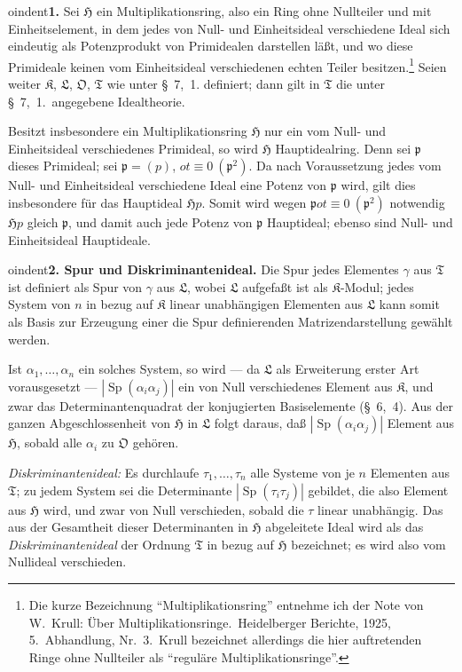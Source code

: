 \documentclass[12pt,a4paper]{article}
\newcommand{\idealp}{\mathfrak{p}}
\newcommand{\HH}{\mathfrak{H}}          %
\DeclareMathOperator{\Sp}{Sp}           %
\newcommand{\TT}{\mathfrak{T}}          %
\theoremstyle{definition}
\begin{document}
\medskip



oindent\textbf{1.} Sei $\HH$ ein Multiplikationsring, also ein Ring ohne
Nullteiler und mit Einheitselement, in dem jedes von Null- und
Einheitsideal verschiedene Ideal sich eindeutig als Potenzprodukt von
Primidealen darstellen l\"a\ss t, und wo diese Primideale keinen vom
Einheitsideal verschiedenen echten Teiler besitzen.\footnote{Die kurze
Bezeichnung ``Multiplikationsring'' entnehme ich der Note von W.\ Krull:
\"Uber Multiplikationsringe.\ Heidelberger Berichte, 1925, 5.\ Abhandlung,
Nr.\ 3.\ Krull bezeichnet allerdings die hier auftretenden Ringe ohne
Nullteiler als ``regul\"are Multiplikationsringe''.} Seien weiter
$\mathfrak{K}$, $\mathfrak{L}$, $\mathfrak{O}$, $\TT$ wie unter \S~7,~1. definiert; dann gilt in $\TT$ die unter \S~7,~1.\ angegebene Idealtheorie.

Besitzt insbesondere ein Multiplikationsring $\HH$ nur ein vom Null- und
Einheitsideal verschiedenes Primideal, so wird $\HH$ Hauptidealring.
Denn sei $\idealp$ dieses Primideal; sei $\idealp = (p)$, $ ot\equiv
0\ (\idealp^2)$. Da nach Voraussetzung jedes vom Null- und Einheitsideal
verschiedene Ideal eine Potenz von $\idealp$ wird, gilt dies insbesondere
f\"ur das Hauptideal $\HH p$. Somit wird wegen $\idealp  ot\equiv
0\ (\idealp^2)$ notwendig $\HH p$ gleich $\idealp$, und damit auch jede
Potenz von $\idealp$ Hauptideal; ebenso sind Null- und Einheitsideal
Hauptideale.

\medskip



oindent\textbf{2. Spur und Diskriminantenideal.} Die Spur jedes Elementes
$\gamma$ aus $\TT$ ist definiert als Spur von $\gamma$ aus $\mathfrak{L}$,
wobei $\mathfrak{L}$ aufgefa\ss t ist als $\mathfrak{K}$-Modul; jedes System
von $n$ in bezug auf $\mathfrak{K}$ linear unabh\"angigen Elementen aus
$\mathfrak{L}$ kann somit als Basis zur Erzeugung einer die Spur
definierenden Matrizendarstellung gew\"ahlt werden.

Ist $\alpha_1,\dots,\alpha_n$ ein solches System, so wird --- da
$\mathfrak{L}$ als Erweiterung erster Art vorausgesetzt ---
$|\Sp(\alpha_i\alpha_j)|$ ein von Null verschiedenes Element aus
$\mathfrak{K}$, und zwar das Determinantenquadrat der konjugierten
Basiselemente (\S~6,~4). Aus der ganzen Abgeschlossenheit von $\HH$ in
$\mathfrak{L}$ folgt daraus, da\ss{} $|\Sp(\alpha_i\alpha_j)|$ Element aus
$\HH$, sobald alle $\alpha_i$ zu $\mathfrak{O}$ geh\"oren.

\textit{Diskriminantenideal:} Es durchlaufe $\tau_1,\dots,\tau_n$ alle Systeme
von je $n$ Elementen aus $\TT$; zu jedem System sei die Determinante
$|\Sp(\tau_i\tau_j)|$ gebildet, die also Element aus $\HH$ wird, und zwar
von Null verschieden, sobald die $\tau$ linear unabh\"angig. Das aus der
Gesamtheit dieser Determinanten in $\HH$ abgeleitete Ideal wird als das
\textit{Diskriminantenideal} der Ordnung $\TT$ in bezug auf $\HH$
bezeichnet; es wird also vom Nullideal verschieden.
\end{document}
